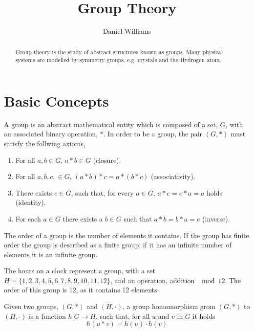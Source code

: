 \documentclass[]{dwnotes}
\title{Group Theory}
\author{Daniel Williams}
\begin{document}
\maketitle

\begin{abstract}
  Group theory is the study of abstract structures known as
  groups. Many physical systems are modelled by symmetry groups,
  e.g. crystals and the Hydrogen atom.
\end{abstract}

\section{Basic Concepts}
\label{sec:intro}

\begin{definition}[Group]
  A group is an abstract mathematical entity which is composed of a
  set, $G$, with an associated binary operation, $*$. In order to be a
  group, the pair $(G, *)$ must satisfy the follwing axioms,
  \begin{enumerate}
  \item For all $a,b \in G$, $a*b \in G$
    (closure). \label{itm:groupclosure} \item For all $a,b,c, \in G$, $(a*b)*c = a*(b*c)$ (associativity). \label{itm:groupassoc}
\item There exists $e \in G$, such that, for every $a \in G$, $a*e = e*a = a$ holds (identity). \label{itm:groupidentity}
  \item For each $a \in G$ there exists a $b \in G$ such that $a*b = b*a = e$ (inverse). \label{itm:groupinverse}
  \end{enumerate}
\end{definition}
\begin{definition}
  The order of a group is the number of elements it contains. If the
  group has finite order the group is described as a finite group; if
  it has an infinite number of elements it is an infinite group.
\end{definition}
\begin{example}
  The hours on a clock represent a group, with a set $H =
  \{1,2,3,4,5,6,7,8,9,10,11,12\}$, and an operation, addition $\mod
  12$. The order of this group is 12, as it contains 12 elements.
\end{example}
\begin{definition}[Homomorphism]
  Given two groups, $(G,*)$ and $(H, \cdot)$, a group homomorphism
  grom $(G,*)$ to $(H, \cdot)$ is a function $h|G \to H$, such that,
  for all $u$ and $v$ in $G$ it holds
  \[ h(u * v) = h(u)\cdot h(v) \]
\end{definition}
\end{document}
